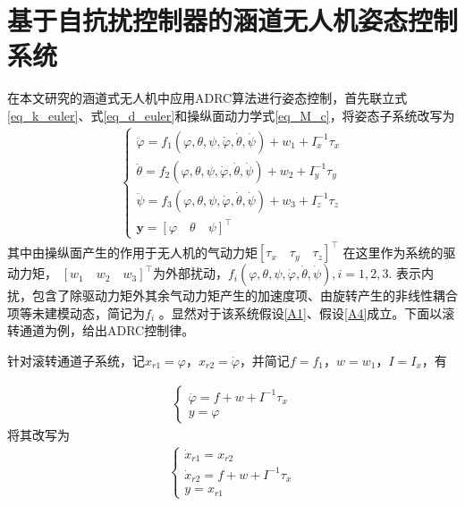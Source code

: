 \section{基于自抗扰控制器的涵道无人机姿态控制系统}
在本文研究的涵道式无人机中应用ADRC算法进行姿态控制，首先联立式\eqref{eq_k_euler}、式\eqref{eq_d_euler}和操纵面动力学式\eqref{eq_M_c}，将姿态子系统改写为
\begin{align}
\left\{\begin{array}{l}
\ddot{\varphi}=f_{1}( \varphi, \theta, \psi, \dot{\varphi}, \dot{\theta}, \dot{\psi}) +w_{1}+I_{x}^{-1} \tau_{x} \\
\ddot{\theta}=f_{2}(\varphi, \theta, \psi, \dot{\varphi}, \dot{\theta}, \dot{\psi})+w_{2}+I_{y}^{-1} \tau_{y} \\
\ddot{\psi}=f_{3}(\varphi, \theta, \psi, \dot{\varphi}, \dot{\theta}, \dot{\psi})+w_{3}+I_{z}^{-1} \tau_{z} \\
\bm{y}=[\varphi \quad \theta \quad \psi]^\top
\end{array}\right.	\label{eq_attitude_sys}
\end{align}
其中由操纵面产生的作用于无人机的气动力矩$ [\tau_{x} \quad \tau_{y} \quad \tau_{z}] ^\top $ 在这里作为系统的驱动力矩， $  [w_{1} \quad w_{2} \quad w_{3}]^\top $为外部扰动，$f_{i}( \varphi, \theta, \psi, \dot{\varphi}, \dot{\theta}, \dot{\psi}),i=1,2,3. $ 表示内扰，包含了除驱动力矩外其余气动力矩产生的加速度项、由旋转产生的非线性耦合项等未建模动态，简记为$ f_{i} $ 。显然对于该系统假设\ref{A1}、假设\ref{A4}成立。下面以滚转通道为例，给出ADRC控制律。

针对滚转通道子系统，记$ x_{r1}=\varphi $，$ x_{r2}=\dot{\varphi} $，并简记$ f=f_1 $，$ w=w_1 $，$ I= I_{x}$，有

\begin{align}
\left\{\begin{array}{l}
\ddot{\varphi}=f +w+I^{-1} \tau_{x}	\\
{y}=\varphi
\end{array}\right.
\end{align}
将其改写为
\begin{align}
\left\{\begin{array}{l}
\dot{x}_{r1}=x_{r2} \\
\dot{x}_{r2}=f+w+I^{-1} \tau_{x} \\
y=x_{r1}
\end{array}\right.	\label{eq_roll_sys}
\end{align}

